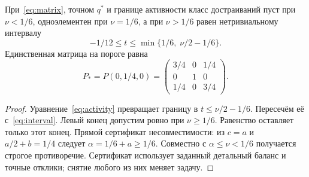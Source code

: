 \begin{theorem}\label{thm:threshold}
{При~\eqref{eq:matrix}, точном $q^*$ и границе активности класс достраиваний пуст при $\nu<1/6$, одноэлементен при $\nu=1/6$, а при $\nu>1/6$ равен нетривиальному интервалу}
\begin{equation}\label{eq:capinterval}
 -1/12\leq t\leq\min\{1/6,\;\nu/2-1/6\}.
\end{equation}
{Единственная матрица на пороге равна}
\begin{equation}\label{eq:singleton}
 P_* = P(0,1/4,0)=\begin{pmatrix}
 3/4 & 0 & 1/4 \\
 0 & 1 & 0 \\
 1/4 & 0 & 3/4
 \end{pmatrix}.
\end{equation}
\end{theorem}
\begin{proof}
{Уравнение~\eqref{eq:activity} превращает границу в $t\leq\nu/2-1/6$. Пересечём её с~\eqref{eq:interval}. Левый конец допустим ровно при $\nu\geq1/6$. Равенство оставляет только этот конец. Прямой сертификат несовместимости: из $c=a$ и $a/2+b=1/4$ следует $\alpha=1/6+a\geq1/6$. Совместно с $\alpha\leq\nu<1/6$ получается строгое противоречие. Сертификат использует заданный детальный баланс и точные отклики; снятие любого из них меняет задачу.}
\end{proof}

